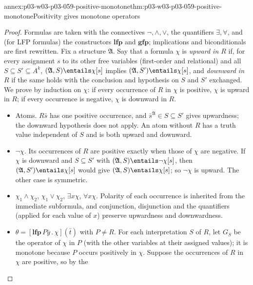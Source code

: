\begin{annexitem}{annex:p03-w03-p03-059-positive-monotone}{thm:p03-w03-p03-059-positive-monotone}{Positivity gives monotone operators}
\begin{proof}
Formulas are taken with the connectives \(\neg,\land,\lor\), the
quantifiers \(\exists,\forall\), and (for LFP formulas) the constructors
\(\mathbf{lfp}\) and \(\mathbf{gfp}\); implications and biconditionals are
first rewritten. Fix a structure \(\mathfrak A\). Say that a formula
\(\chi\) is \emph{upward in \(R\)} if, for every assignment \(s\) to its
other free variables (first-order and relational) and all
\(S\subseteq S'\subseteq A^k\), \((\mathfrak A,S)\entails\chi[s]\) implies
\((\mathfrak A,S')\entails\chi[s]\), and \emph{downward in \(R\)} if the
same holds with the conclusion and hypothesis on \(S\) and \(S'\)
exchanged. We prove by induction on \(\chi\): if every occurrence of \(R\)
in \(\chi\) is positive, \(\chi\) is upward in \(R\); if every occurrence is
negative, \(\chi\) is downward in \(R\).
\begin{itemize}
 \item Atoms. \(R\bar s\) has one positive occurrence, and
       \(\bar s^{\mathfrak A}\in S\subseteq S'\) gives upwardness; the
       downward hypothesis does not apply. An atom without \(R\) has a truth
       value independent of \(S\) and is both upward and downward.
 \item \(\neg\chi\). Its occurrences of \(R\) are positive exactly when those
       of \(\chi\) are negative. If \(\chi\) is downward and \(S\subseteq S'\)
       with \((\mathfrak A,S)\entails\neg\chi[s]\), then
       \((\mathfrak A,S')\entails\chi[s]\) would give
       \((\mathfrak A,S)\entails\chi[s]\); so \(\neg\chi\) is upward. The
       other case is symmetric.
 \item \(\chi_1\land\chi_2\), \(\chi_1\lor\chi_2\), \(\exists x\chi\),
       \(\forall x\chi\). Polarity of each occurrence is inherited from the
       immediate subformula, and conjunction, disjunction and the
       quantifiers (applied for each value of \(x\)) preserve upwardness and
       downwardness.
 \item \(\theta=[\mathbf{lfp}\,P\bar y\,.\,\chi](\bar t)\) with \(P\neq R\).
       For each interpretation \(S\) of \(R\), let \(G_S\) be the operator
       of \(\chi\) in \(P\) (with the other variables at their assigned
       values); it is monotone because \(P\) occurs positively in \(\chi\).
       Suppose the occurrences of \(R\) in \(\chi\) are positive, so by the

\end{itemize}
\end{proof}
\end{annexitem}
